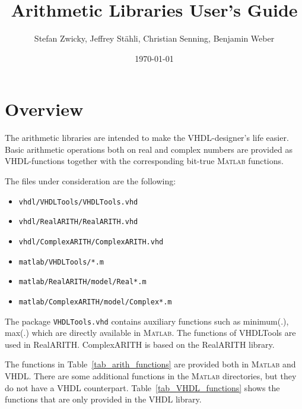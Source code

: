 \documentclass[a4paper,11pt]{article}
\begin{document}
\title{Arithmetic Libraries User's Guide}
\author{Stefan Zwicky, Jeffrey St\"{a}hli, Christian Senning, Benjamin Weber}
\date{\today}
\maketitle

\section{Overview}
The arithmetic libraries are intended to make the VHDL-designer's life
easier. Basic arithmetic operations both on real and complex numbers
are provided as VHDL-functions together with the corresponding
bit-true \textsc{Matlab} functions.

The files under consideration are the following:
\begin{itemize}
\item \texttt{vhdl/VHDLTools/VHDLTools.vhd}
\item \texttt{vhdl/RealARITH/RealARITH.vhd}
\item \texttt{vhdl/ComplexARITH/ComplexARITH.vhd}
\item \texttt{matlab/VHDLTools/*.m}
\item \texttt{matlab/RealARITH/model/Real*.m}
\item \texttt{matlab/ComplexARITH/model/Complex*.m}
\end{itemize}
The package \texttt{VHDLTools.vhd} contains auxiliary functions such
as minimum(.), max(.) which are directly available in
\textsc{Matlab}. The functions of VHDLTools are used in
RealARITH. ComplexARITH is based on the RealARITH library.

The functions in Table~\ref{tab_arith_functions} are provided both in
\textsc{Matlab} and VHDL. There are some additional functions in the
\textsc{Matlab} directories, but they do not have a VHDL
counterpart. Table~\ref{tab_VHDL_functions} shows the functions that
are only provided in the VHDL library.
\end{document}
